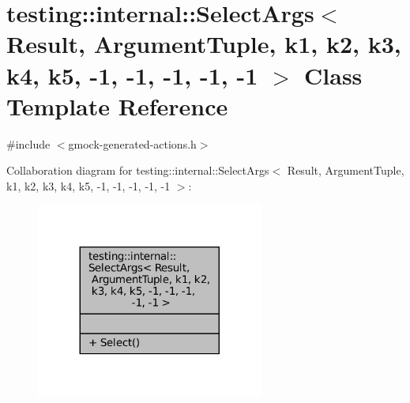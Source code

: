 \hypertarget{classtesting_1_1internal_1_1SelectArgs_3_01Result_00_01ArgumentTuple_00_01k1_00_01k2_00_01k3_00_dabb861d0dfd59e876e4adc8d7e61c25}{}\section{testing\+:\+:internal\+:\+:Select\+Args$<$ Result, Argument\+Tuple, k1, k2, k3, k4, k5, -\/1, -\/1, -\/1, -\/1, -\/1 $>$ Class Template Reference}
\label{classtesting_1_1internal_1_1SelectArgs_3_01Result_00_01ArgumentTuple_00_01k1_00_01k2_00_01k3_00_dabb861d0dfd59e876e4adc8d7e61c25}


{\ttfamily \#include $<$gmock-\/generated-\/actions.\+h$>$}



Collaboration diagram for testing\+:\+:internal\+:\+:Select\+Args$<$ Result, Argument\+Tuple, k1, k2, k3, k4, k5, -\/1, -\/1, -\/1, -\/1, -\/1 $>$\+:
\nopagebreak
\begin{figure}[H]
\begin{center}
\leavevmode
\includegraphics[width=212pt]{classtesting_1_1internal_1_1SelectArgs_3_01Result_00_01ArgumentTuple_00_01k1_00_01k2_00_01k3_00_2df5b0f2fef1faa3a61a1fe1c08a11cf}
\end{center}
\end{figure}
